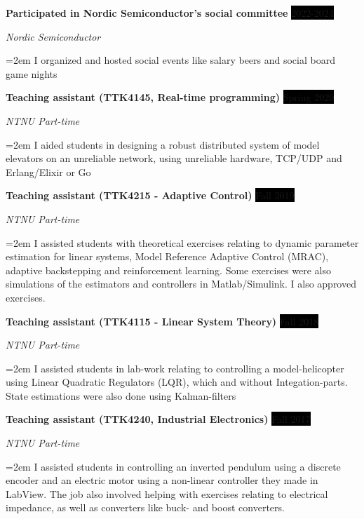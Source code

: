 \documentclass[paper=a4,fontsize=11pt,norsk]{scrartcl} %
\newcommand{\EducationEntry}[4]{
		\noindent \textbf{#1} \hfill      %
		\colorbox{Black}{%
			\parbox{6em}{%
			\hfill\color{White}#2}} \par  %
		\noindent \textit{#3} \par        %
		\noindent\hangindent=2em\hangafter=0 \small #4 %
		\normalsize \par}
\newcommand{\WorkEntry}[4]{				  %
		\noindent \textbf{#1} \hfill      %
		\colorbox{Black}{\color{White}#2} \par  %
		\noindent \textit{#3} \par              %
		\noindent\hangindent=2em\hangafter=0 \small #4 %
		\normalsize \par}
\begin{document}




\WorkEntry{Participated in Nordic Semiconductor's social committee}{2022-2024}{Nordic Semiconductor}
{I organized and hosted social events like salary beers and social board game nights}

\WorkEntry{Teaching assistant (TTK4145, Real-time programming)}{Spring 2020}{NTNU Part-time}
{I aided students in designing a robust distributed system of model elevators on an unreliable network, using unreliable hardware, TCP/UDP and Erlang/Elixir or Go}

\WorkEntry{Teaching assistant (TTK4215 - Adaptive Control)}{Fall 2019}{NTNU Part-time}
{I assisted students with theoretical exercises relating to dynamic parameter estimation for linear systems, Model Reference Adaptive Control (MRAC), adaptive backstepping and reinforcement learning. Some exercises were also simulations of the estimators and controllers in Matlab/Simulink. I also approved exercises.
}


\WorkEntry{Teaching assistant (TTK4115 -  Linear System Theory)}{Fall 2018}{NTNU Part-time}
{I assisted students in lab-work relating to controlling a model-helicopter using Linear Quadratic Regulators (LQR), which and without Integation-parts. State estimations were also done using Kalman-filters
}

\WorkEntry{Teaching assistant (TTK4240, Industrial Electronics)}{Fall 2017}{NTNU Part-time}
{I assisted students in controlling an inverted pendulum using a discrete encoder and an electric motor using a non-linear controller they made in LabView. The job also involved helping with exercises relating to electrical impedance, as well as converters like buck- and boost converters.
}
\end{document}
